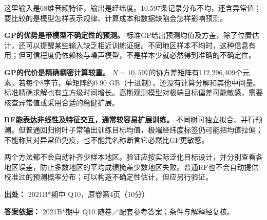 这里输入是68维音频特征，输出是经纬度。10,597条记录分布不均，还含异常值；要比较的是模型怎样表示规律、计算成本和数据缺陷会怎样影响预测。


\textbf{GP的优势是带模型不确定性的预测。} 标准GP给出预测均值及方差，除了位置估计，还可以提醒某些输入缺乏相近训练证据。不同地区样本不均时，这种信息有用；但可信程度仍依赖核与噪声模型，不是样本少就必然得到准确的不确定性。


\textbf{GP的代价是精确稠密计算较重。} \(N=10{,}597\)的协方差矩阵有112,296,409个元素，若每个8字节，单矩阵约0.90 GB（十进制），还没有计算分解和其他中间量。标准精确求解也有立方级时间增长。高斯观测模型对极端目标偏差可能敏感，需要核查异常值或采用合适的稳健扩展。


\textbf{RF能表达非线性及特征交互，通常较容易扩展训练。} 不同树可独立拟合、并行预测。但普通回归树叶子常输出训练目标均值，极端经纬度标签仍可能把均值拉偏；不能称其对异常值免疫，也不能凭名称断言它必然比GP更敏感。


两个方法都不会自动补齐少样本地区。验证应按实际泛化目标设计，并分别查看各地区误差，防止多数地区的平均成绩掩盖少数地区失败。普通RF也不会自动提供校准过的预测概率分布；可以构造不确定性估计，但应另行验证。


\textbf{出处：} 2021B*期中 Q10，原卷第4页（10分）


\textbf{答案依据：} 2021B*期中 Q10 随卷／配套参考答案；条件与解释经复核。
